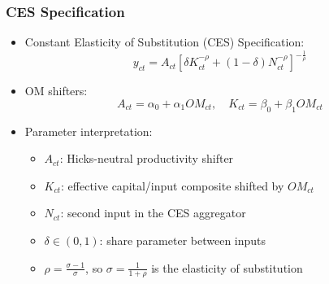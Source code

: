 \documentclass[xcolor = x11names, compress, aspectratio = 169]{beamer}
\renewcommand{\(}{\begin{columns}}
\renewcommand{\)}{\end{columns}}
\newcommand{\<}[1]{\begin{column}{#1}}
\renewcommand{\>}{\end{column}}
\begin{document}
    \begin{frame}
    \frametitle{CES Specification}
    \begin{itemize}
        \item Constant Elasticity of Substitution (CES) Specification:
        \begin{equation}
            y_{ct} = A_{ct}\left[\delta K_{ct}^{-\rho} + (1-\delta)N_{ct}^{-\rho}\right]^{-\frac{1}{\rho}}
        \end{equation}
        \item OM shifters:
        \begin{equation}
            A_{ct} = \alpha_0 + \alpha_1 OM_{ct}, \quad
            K_{ct} = \beta_0 + \beta_1 OM_{ct}
        \end{equation}
        \item Parameter interpretation:
        \begin{itemize}
            \item $A_{ct}$: Hicks-neutral productivity shifter
            \item $K_{ct}$: effective capital/input composite shifted by $OM_{ct}$
            \item $N_{ct}$: second input in the CES aggregator
            \item $\delta \in (0,1)$: share parameter between inputs
            \item $\rho = \frac{\sigma - 1}{\sigma}$, so $\sigma = \frac{1}{1+\rho}$ is the elasticity of substitution
        \end{itemize}
    \end{itemize}
    \end{frame}
    
\end{document}
